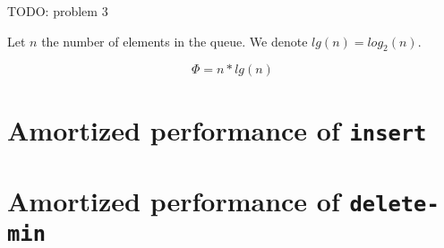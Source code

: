 TODO: problem 3

Let $n$ the number of elements in the queue. We denote $lg(n) = log_2(n)$.

\[
\Phi = n * lg(n)
\]

\section{Amortized performance of \texttt{insert}}
\section{Amortized performance of \texttt{delete-min}}
